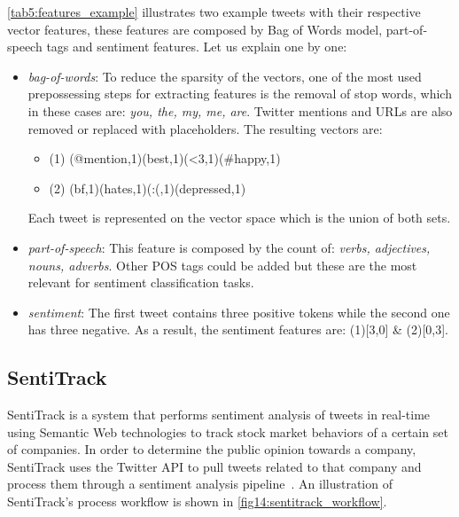 {\begin{itemize}
    \end{itemize}

    \begin{table}[]

    \end{table}
   

    \autoref{tab5:features_example} illustrates two example tweets with their respective vector features, these features are composed by Bag of Words model, part-of-speech tags and sentiment features. Let us explain one by one: 
    
    \begin{itemize}
        \item \textit{bag-of-words}: To reduce the sparsity of the vectors, one of the most used prepossessing steps for extracting features is the removal of stop words, which in these cases are: \textit{you, the, my, me, are}. Twitter mentions and URLs are also removed or replaced with placeholders. The resulting vectors are: 
        \begin{itemize}
            \item (1) {(@mention,1)(best,1)(<3,1)(\#happy,1)} 
            \item (2) {(bf,1)(hates,1)(:(,1)(depressed,1)}
        \end{itemize}
        Each tweet is represented on the vector space which is the union of both sets.
        
        \item \textit{part-of-speech}: This feature is composed by the count of: \textit{verbs, adjectives, nouns, adverbs}. Other POS tags could be added but these are the most relevant for sentiment classification tasks.
        
        \item \textit{sentiment}: The first tweet contains three positive tokens while the second one has three negative. As a result, the sentiment features are: (1)[3,0] \& (2)[0,3].
        
    \end{itemize}
    
    \pagebreak
    
    \subsection{SentiTrack}
    \label{sec:sentitrack}
    
    SentiTrack is a system that performs sentiment analysis of tweets in real-time using Semantic Web technologies to track stock market behaviors of a certain set of companies. In order to determine the public opinion towards a company, SentiTrack uses the Twitter API to pull tweets related to that company and process them through a sentiment analysis pipeline~\cite{danklinked}. An illustration of SentiTrack's process workflow is shown in \autoref{fig14:sentitrack_workflow}. 
    
}
